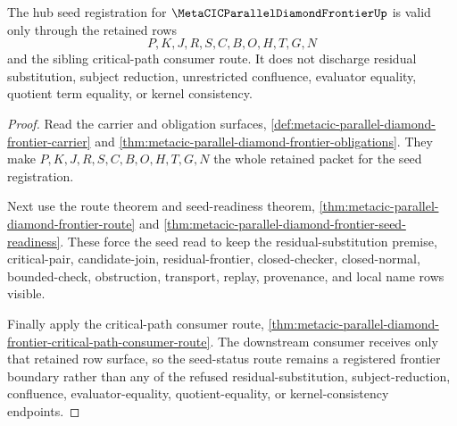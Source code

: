 \begin{theorem}
\label{thm:metacic-parallel-diamond-frontier-seed-status-route}
The hub seed registration for $\MetaCICParallelDiamondFrontierUp$ is valid only through the retained rows
$$
P,K,J,R,S,C,B,O,H,T,G,N
$$
and the sibling critical-path consumer route. It does not discharge residual substitution, subject reduction, unrestricted confluence, evaluator equality, quotient term equality, or kernel consistency.
\end{theorem}
\begin{proof}
Read the carrier and obligation surfaces, \autoref{def:metacic-parallel-diamond-frontier-carrier} and \autoref{thm:metacic-parallel-diamond-frontier-obligations}. They make $P,K,J,R,S,C,B,O,H,T,G,N$ the whole retained packet for the seed registration.

Next use the route theorem and seed-readiness theorem, \autoref{thm:metacic-parallel-diamond-frontier-route} and \autoref{thm:metacic-parallel-diamond-frontier-seed-readiness}. These force the seed read to keep the residual-substitution premise, critical-pair, candidate-join, residual-frontier, closed-checker, closed-normal, bounded-check, obstruction, transport, replay, provenance, and local name rows visible.

Finally apply the critical-path consumer route, \autoref{thm:metacic-parallel-diamond-frontier-critical-path-consumer-route}. The downstream consumer receives only that retained row surface, so the seed-status route remains a registered frontier boundary rather than any of the refused residual-substitution, subject-reduction, confluence, evaluator-equality, quotient-equality, or kernel-consistency endpoints.
\end{proof}

